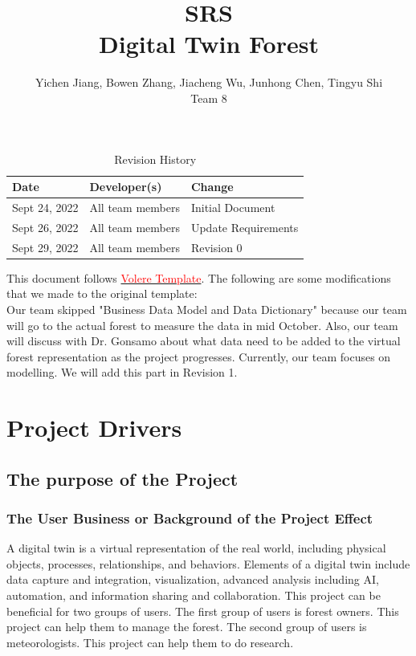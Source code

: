 \documentclass{article}
\title{SRS\\Digital Twin Forest}
\author{Yichen Jiang, Bowen Zhang, Jiacheng Wu, Junhong Chen, Tingyu Shi\\Team 8}
\begin{document}
\maketitle
\newpage
\begin{table}[htp]
\caption{Revision History} 
\begin{tabularx}{\textwidth}{llX}
\toprule
\textbf{Date} & \textbf{Developer(s)} & \textbf{Change}\\
\midrule
Sept 24, 2022 & All team members & Initial Document\\
Sept 26, 2022 & All team members & Update Requirements\\
Sept 29, 2022 & All team members & Revision 0\\

\bottomrule
\end{tabularx}
\end{table}

\vspace{8cm}

\noindent This document follows \href{https://www.cs.uic.edu/~i440/VolereMaterials/templateArchive16/c\%20Volere\%20template16.pdf}{\textcolor{red}{Volere Template}}.
The following are some modifications that we made to the 
original template:\\
Our team skipped "Business Data Model and Data Dictionary" because our team will
go to the actual forest to measure the data in mid October. Also, our team will
discuss with Dr. Gonsamo about what data need to be added to the virtual forest
representation as the project progresses. Currently, our team focuses on modelling.
We will add this part in Revision 1.


\newpage
\tableofcontents
\listoftables
\listoffigures
\cleardoublepage

\section{Project Drivers}
\subsection{The purpose of the Project}
\subsubsection{The User Business or Background of the Project Effect}
A digital twin is a virtual representation of the real world, including physical objects, 
processes, relationships, and behaviors. Elements of a digital twin include data capture
and integration, visualization, advanced analysis including AI, automation, and information
sharing and collaboration. This project can be beneficial for two groups of users.  The first
group of users is forest owners. This project can help them to manage the forest. The 
second group of users is meteorologists. This project can help them to 
do research.
\end{document}
